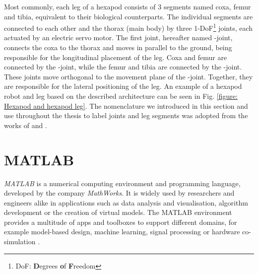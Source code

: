 Most commonly, each leg of a hexapod consists of 3 segments named coxa, femur and tibia, equivalent to their biological counterparts.
The individual segments are connected to each other and the thorax (main body) by three 1-DoF\footnote{DoF: \textbf{D}egrees \textbf{o}f \textbf{F}reedom} joints, each actuated by an electric servo motor.
The first joint, hereafter named \textalpha-joint, connects the coxa to the thorax and moves in parallel to the ground, being responsible for the longitudinal placement of the leg.
Coxa and femur are connected by the \textbeta-joint, while the femur and tibia are connected by the \textgamma-joint. 
These joints move orthogonal to the movement plane of the \textalpha-joint. Together, they are responsible for the lateral positioning of the leg.
An example of a hexapod robot and leg based on the described architecture can be seen in Fig. \ref{figure: Hexapod and hexapod leg}.
The nomenclature we introduced in this section and use throughout the thesis to label joints and leg segments was adopted from the works of 
\cite{schilling2013walknet} and \cite{HeterarchicalArchitectureSchilling}.


\section{MATLAB}
\textit{MATLAB\textsuperscript{\textregistered}} is a numerical computing environment and programming language, developed by the company \textit{MathWorks\textsuperscript{\textregistered}}.
It is widely used by researchers and engineers alike in applications such as data analysis and visualisation, algorithm development or the creation of virtual models.
The MATLAB environment provides a multitude of apps and toolboxes to support different domains, for example model-based design, machine learning, signal processing or hardware co-simulation \parencite{MATLAB}.

